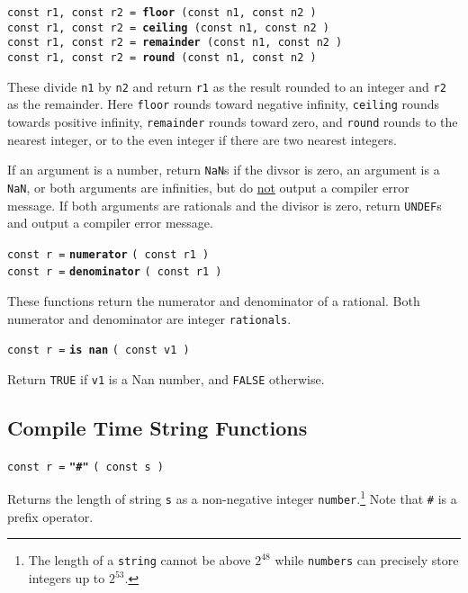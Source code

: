 \documentclass[12pt]{article}
\newcommand{\ttkey}[1]{{\tt \bfseries #1}}
\newenvironment{indpar}[1][0.3in]%
	{\begin{list}{}%
		     {\setlength{\itemsep}{0in}%
		      \setlength{\topsep}{0in}%
		      \setlength{\parsep}{1ex}%
		      \setlength{\labelwidth}{#1}%
		      \setlength{\leftmargin}{#1}%
		      \addtolength{\leftmargin}{\labelsep}}%
	 \item}%
	{\end{list}}
\begin{document}
{\tt const r1, const r2 = \ttkey{floor} (const n1, const n2 )} \\
{\tt const r1, const r2 = \ttkey{ceiling} (const n1, const n2 )} \\
{\tt const r1, const r2 = \ttkey{remainder} (const n1, const n2 )} \\
{\tt const r1, const r2 = \ttkey{round} (const n1, const n2 )}
\begin{indpar}
These divide {\tt n1} by {\tt n2} and return {\tt r1} as the
result rounded to an integer and {\tt r2} as the remainder.
Here {\tt floor} rounds toward negative infinity, {\tt ceiling}
rounds towards positive infinity, {\tt remainder} rounds toward
zero, and {\tt round} rounds to the nearest integer, or to the
even integer if there are two nearest integers.

If an argument is a number, return {\tt NaN}s if the divsor is
zero, an argument is a {\tt NaN}, or both arguments are infinities, but
do \underline{not} output a compiler error message.  If both
arguments are rationals and the divisor is zero, return
{\tt UNDEF}s and output a compiler error message.
\end{indpar}

{\tt const r =} \ttkey{numerator} {\tt ( const r1 )} \\
{\tt const r =} \ttkey{denominator} {\tt ( const r1 )}
\begin{indpar}
These functions return the numerator and denominator of a rational.
Both numerator and denominator are integer {\tt rationals}.
\end{indpar}

{\tt const r =} \ttkey{is nan} {\tt ( const v1 )}
\begin{indpar}
Return {\tt TRUE} if {\tt v1} is a Nan number, and {\tt FALSE}
otherwise.
\end{indpar}

\subsection{Compile Time String Functions}

{\tt const r =} \ttkey{"\#"} {\tt ( const s )}
\begin{indpar}
Returns the length of string {\tt s} as a non-negative integer
{\tt number}.\footnote{The length of a {\tt string} cannot
be above $2^{48}$ while
{\tt numbers} can precisely store integers up to $2^{53}$.}
Note that {\tt \#} is a prefix operator.
\end{indpar}
\end{document}
